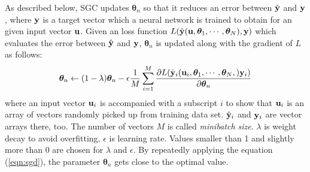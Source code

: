 \documentclass[twocolumn]{article}
\begin{document}
As described below,
SGC updates ${\bm \theta}_n$ so that it reduces an error
between $\hat{\bf y}$ and ${\bf y}$,
where ${\bf y}$ is a target vector
which a neural network is trained to obtain
for an given input vector ${\bf u}$.
Given an loss function
$L(\hat{\bf y}({\bf u},{\bm \theta}_1,\cdots,{\bm \theta}_N),{\bf y})$
which evaluates the error between $\hat{\bf y}$ and ${\bf y}$,
${\bm \theta}_n$ is updated along with the gradient of $L$ as follows:
\begin{eqnarray}
{\bm \theta}_n \leftarrow
(1-\lambda){\bm \theta}_n
- \epsilon
  \frac{1}{M}\sum_{i=1}^M
  \frac{\partial L(\hat{\bf y}_i({\bf u}_i,{\bm \theta}_1,
                               \cdots,{\bm \theta}_N,)
                   {\bf y}_i)}
       {\partial {\bm \theta}_n}\label{eqn:sgd}
\end{eqnarray}
where an input vector ${\bf u}_i$ is accompanied with a subscript $i$
to show that ${\bf u}_i$ is an array of vectors randomly picked up
from training data set.
$\hat{\bf y}_i$ and ${\bf y}_i$ are vector arrays there, too.
The number of vectors $M$ is called {\it minibatch size}.
$\lambda$ is weight decay to avoid overfitting,
$\epsilon$ is learning rate.
Values smaller than 1 and slightly more than 0 are chosen
for $\lambda$ and $\epsilon$.
By repeatedly applying the equation (\ref{eqn:sgd}),
the parameter ${\bm \theta}_n$ gets close to the optimal value.
\end{document}
